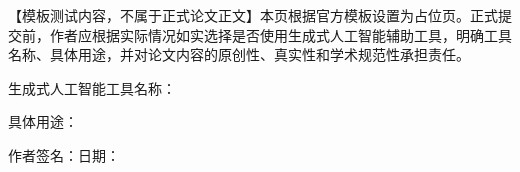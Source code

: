 
【模板测试内容，不属于正式论文正文】本页根据官方模板设置为占位页。正式提交前，作者应根据实际情况如实选择是否使用生成式人工智能辅助工具，明确工具名称、具体用途，并对论文内容的原创性、真实性和学术规范性承担责任。

\vspace{1cm}
\noindent 生成式人工智能工具名称：\underline{\hspace{8cm}}

\vspace{0.6cm}
\noindent 具体用途：\underline{\hspace{10cm}}

\vspace{1cm}
\noindent 作者签名：\underline{\hspace{4cm}}\hfill 日期：\underline{\hspace{4cm}}

